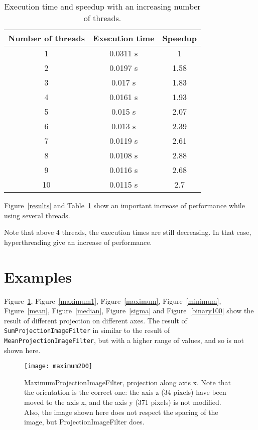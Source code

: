 \documentclass{InsightArticle}
\begin{document}
\begin{table}[htbp]
\centering
\begin{tabular}{ccc}
\hline
Number of threads & Execution time & Speedup \\
\hline
\hline
1      & 0.0311 s & 1 \\
2      & 0.0197 s & 1.58\\
3      & 0.017  s & 1.83\\
4      & 0.0161 s & 1.93\\
5      & 0.015  s & 2.07\\
6      & 0.013  s & 2.39\\
7      & 0.0119 s & 2.61\\
8      & 0.0108 s & 2.88\\
9      & 0.0116 s & 2.68\\
10     & 0.0115 s & 2.7\\
\hline
\end{tabular}
\caption{Execution time and speedup with an increasing number of threads.\label{thread}}
\end{table}



Figure~\ref{results} and Table~\ref{thread} show an important increase of performance while using several
threads.

Note that above 4 threads, the execution times are still decreasing. In that case,
hyperthreading give an increase of performance.

\section{Examples}
Figure~\ref{maximum0}, Figure~\ref{maximum1}, Figure~\ref{maximum},
Figure~\ref{minimum}, Figure~\ref{mean}, Figure~\ref{median},
Figure~\ref{sigma} and Figure~\ref{binary100} show the result
of different projection on different axes. The result of
\verb$SumProjectionImageFilter$ in similar to the result of \verb$MeanProjectionImageFilter$,
but with a higher range of values, and so is not shown here.

\begin{figure}[htbp]
\centering
\texttt{[image: maximum2D0]}
\caption{MaximumProjectionImageFilter, projection along axis x. Note that the orientation
is the correct one: the axis z (34 pixels) have been moved to the axis x, and the axis y
(371 pixels) is not modified. Also, the image shown here does not respect the spacing
of the image, but ProjectionImageFilter does.\label{maximum0}}
\end{figure}
\end{document}
